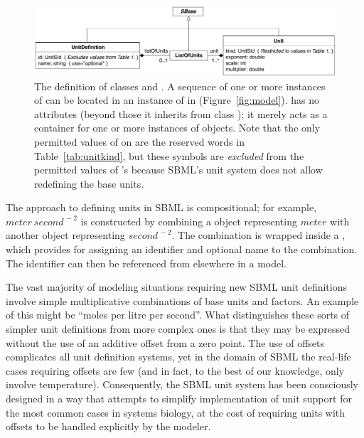 \begin{figure}[htb]
  \centering
  \includegraphics[scale=0.79]{figs/unitdefinition-uml}
  \caption{The definition of classes \UnitDefinition and
      \Unit.  A sequence of one or more instances of
      \UnitDefinition can be located in an instance of
      \ListOfUnitDefinitions in \Model
      (Figure~\protect\ref{fig:model}).   has
      no attributes (beyond those it inherits from class \SBase);
      it merely acts as a container for one or more instances of
      \Unit objects.  Note that the only permitted values of
       on \Unit are the reserved words in
      Table~\vref{tab:unitkind}, but these symbols are
      \emph{excluded} from the permitted values of
      \UnitDefinition's  because SBML's unit system does
      not allow redefining the base units.}
  \label{fig:unitdefinition}
\end{figure}

The approach to defining units in SBML is compositional; for
example, $meter\ second^{\,-2}$ is constructed by combining a
\Unit object representing $meter$ with another \Unit object
representing $second^{\,-2}$.  The combination is wrapped inside a
\UnitDefinition, which provides for assigning an identifier and
optional name to the combination.  The identifier can then be
referenced from elsewhere in a model.

The vast majority of modeling situations requiring new SBML unit
definitions involve simple multiplicative combinations of base
units and factors.  An example of this might be ``moles per litre
per second''.  What distinguishes these sorts of simpler unit
definitions from more complex ones is that they may be expressed
without the use of an additive offset from a zero point.  The use
of offsets complicates all unit definition systems, yet in the
domain of SBML the real-life cases requiring offsets are few (and
in fact, to the best of our knowledge, only involve temperature).
Consequently, the SBML unit system has been consciously designed
in a way that attempts to simplify implementation of unit support
for the most common cases in systems biology, at the cost of
requiring units with offsets to be handled explicitly by the
modeler.


